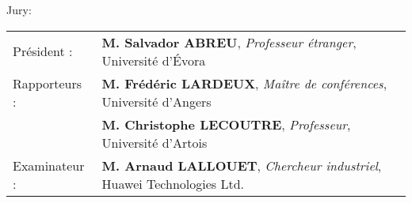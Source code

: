 \begin{titlepage}
\begin{center}
\end{center}
\end{titlepage}
\restoregeometry
\sloppy\pagebreak


\begin{vcentrepage}
{ \begin{center}\Large {\sc Jury}:  \end{center}}
\vspace{1em}

\begin{tabular}{ll}
Président : & \textbf{M. Salvador ABREU}, \textit{Professeur étranger}, Université d'Évora \\
Rapporteurs : & \textbf{M. Frédéric LARDEUX}, \textit{Maître de conférences}, Université d'Angers \\
& \textbf{M. Christophe LECOUTRE}, \textit{Professeur}, Université d'Artois \\
Examinateur : & \textbf{M. Arnaud LALLOUET}, \textit{Chercheur industriel}, Huawei Technologies Ltd. \\
\end{tabular}

\pagestyle{plain}


\end{vcentrepage}
